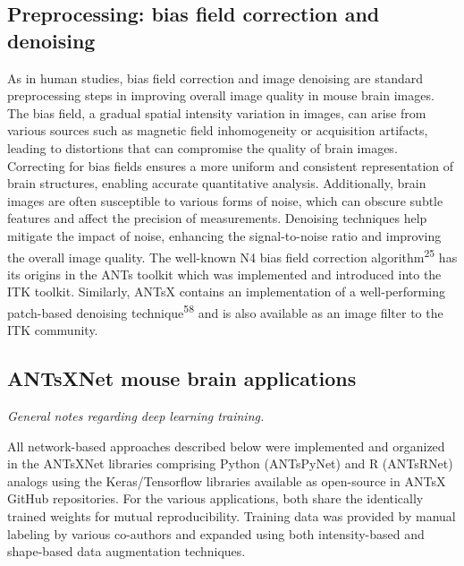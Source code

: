 \documentclass[
  12pt,
]{article}
\begin{document}
\hypertarget{preprocessing-bias-field-correction-and-denoising}{%
\subsection*{Preprocessing: bias field correction and
denoising}\label{preprocessing-bias-field-correction-and-denoising}}

As in human studies, bias field correction and image denoising are
standard preprocessing steps in improving overall image quality in mouse
brain images. The bias field, a gradual spatial intensity variation in
images, can arise from various sources such as magnetic field
inhomogeneity or acquisition artifacts, leading to distortions that can
compromise the quality of brain images. Correcting for bias fields
ensures a more uniform and consistent representation of brain
structures, enabling accurate quantitative analysis. Additionally, brain
images are often susceptible to various forms of noise, which can
obscure subtle features and affect the precision of measurements.
Denoising techniques help mitigate the impact of noise, enhancing the
signal-to-noise ratio and improving the overall image quality. The
well-known N4 bias field correction algorithm\textsuperscript{25} has
its origins in the ANTs toolkit which was implemented and introduced
into the ITK toolkit. Similarly, ANTsX contains an implementation of a
well-performing patch-based denoising technique\textsuperscript{58} and
is also available as an image filter to the ITK community.

\hypertarget{antsxnet-mouse-brain-applications}{%
\subsection*{ANTsXNet mouse brain
applications}\label{antsxnet-mouse-brain-applications}}

\emph{General notes regarding deep learning training.}

All network-based approaches described below were implemented and
organized in the ANTsXNet libraries comprising Python (ANTsPyNet) and R
(ANTsRNet) analogs using the Keras/Tensorflow libraries available as
open-source in ANTsX GitHub repositories. For the various applications,
both share the identically trained weights for mutual reproducibility.
Training data was provided by manual labeling by various co-authors and
expanded using both intensity-based and shape-based data augmentation
techniques.
\end{document}
